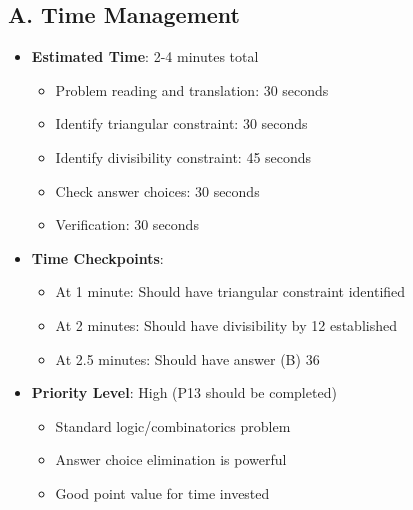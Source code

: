 \documentclass[12pt]{article}
\begin{document}
\begin{competitionbox}
\subsection*{A. Time Management}
\begin{itemize}[leftmargin=*]
    \item \textbf{Estimated Time}: 2-4 minutes total
    \begin{itemize}
        \item Problem reading and translation: 30 seconds
        \item Identify triangular constraint: 30 seconds
        \item Identify divisibility constraint: 45 seconds
        \item Check answer choices: 30 seconds
        \item Verification: 30 seconds
    \end{itemize}
    \item \textbf{Time Checkpoints}: 
    \begin{itemize}
        \item At 1 minute: Should have triangular constraint identified
        \item At 2 minutes: Should have divisibility by 12 established
        \item At 2.5 minutes: Should have answer (B) 36
    \end{itemize}
    \item \textbf{Priority Level}: High (P13 should be completed)
    \begin{itemize}
        \item Standard logic/combinatorics problem
        \item Answer choice elimination is powerful
        \item Good point value for time invested
    \end{itemize}
\end{itemize}


\end{competitionbox}
\end{document}
